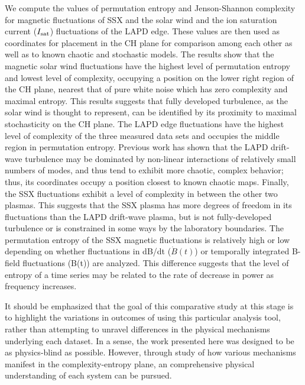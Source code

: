 \documentclass[aps,pre,twocolumn,secnumarabic,nobalancelastpage,amsmath,amssymb,
nofootinbib]{revtex4-1}
\begin{document}
We compute the values of permutation entropy and Jenson-Shannon complexity for magnetic fluctuations of SSX and the solar wind and the ion saturation current ($I_{\rm sat}$) fluctuations of the LAPD edge. These values are then used as coordinates for placement in the CH plane for comparison among each other as well as to known chaotic and stochastic models. The results show that the magnetic solar wind fluctuations have the highest level of permutation entropy and lowest level of complexity, occupying a position on the lower right region of the CH plane, nearest that of pure white noise which has zero complexity and maximal entropy. This results suggests that fully developed turbulence, as the solar wind is thought to represent, can be identified by its proximity to maximal stochasticity on the CH plane. The LAPD edge fluctuations have the highest level of complexity of the three measured data sets and occupies the middle region in permutation entropy. Previous work has shown that the LAPD drift-wave turbulence may be dominated by non-linear interactions of relatively small numbers of modes, and thus tend to exhibit more chaotic, complex behavior; thus, its coordinates occupy a position closest to known chaotic maps. Finally, the SSX fluctuations exhibit a level of complexity in between the other two plasmas. This suggests that the SSX plasma has more degrees of freedom in its fluctuations than the LAPD drift-wave plasma, but is not fully-developed turbulence or is constrained in some ways by the laboratory boundaries. The permutation entropy of the SSX magnetic fluctuations is relatively high or low depending on whether fluctuations in dB/dt ($\dot{B}(t)$) or temporally integrated B-field fluctuations (B(t)) are analyzed. This difference suggests that the level of entropy of a time series may be related to the rate of decrease in power as frequency increases.

It should be emphasized that the goal of this comparative study at this stage is to highlight the variations in outcomes of using this particular analysis tool, rather than attempting to unravel differences in the physical mechanisms underlying each dataset. In a sense, the work presented here was designed to be as physics-blind as possible. However, through study of how various mechanisms manifest in the complexity-entropy plane, an comprehensive physical understanding of each system can be pursued.
\end{document}
